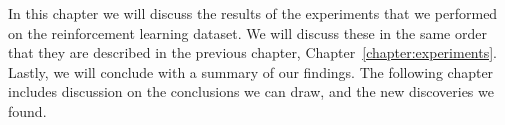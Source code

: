 \label{chapter:results}

In this chapter we will discuss the results of the experiments that we 
performed on the reinforcement learning dataset. We will discuss these in the 
same order that they are described in the previous chapter, 
Chapter~\ref{chapter:experiments}. Lastly, we will conclude with a summary of 
our findings. The following chapter includes discussion on the conclusions we 
can draw, and the new discoveries we found. 








